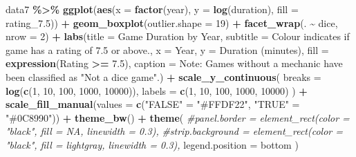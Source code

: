 \documentclass[
]{article}
\newenvironment{Shaded}{\begin{snugshade}}{\end{snugshade}}
\newcommand{\AttributeTok}[1]{\textcolor[rgb]{0.13,0.29,0.53}{#1}}
\newcommand{\CommentTok}[1]{\textcolor[rgb]{0.56,0.35,0.01}{\textit{#1}}}
\newcommand{\DecValTok}[1]{\textcolor[rgb]{0.00,0.00,0.81}{#1}}
\newcommand{\FloatTok}[1]{\textcolor[rgb]{0.00,0.00,0.81}{#1}}
\newcommand{\FunctionTok}[1]{\textcolor[rgb]{0.13,0.29,0.53}{\textbf{#1}}}
\newcommand{\NormalTok}[1]{#1}
\newcommand{\OtherTok}[1]{\textcolor[rgb]{0.56,0.35,0.01}{#1}}
\newcommand{\SpecialCharTok}[1]{\textcolor[rgb]{0.81,0.36,0.00}{\textbf{#1}}}
\newcommand{\StringTok}[1]{\textcolor[rgb]{0.31,0.60,0.02}{#1}}
\begin{document}
\begin{Shaded}
\begin{Highlighting}[]
\NormalTok{data7 }\SpecialCharTok{\%\textgreater{}\%}
  \FunctionTok{ggplot}\NormalTok{(}\FunctionTok{aes}\NormalTok{(}\AttributeTok{x =} \FunctionTok{factor}\NormalTok{(year), }\AttributeTok{y =} \FunctionTok{log}\NormalTok{(duration), }\AttributeTok{fill =}\NormalTok{ rating\_7}\FloatTok{.5}\NormalTok{)) }\SpecialCharTok{+}
  \FunctionTok{geom\_boxplot}\NormalTok{(}\AttributeTok{outlier.shape =} \DecValTok{19}\NormalTok{) }\SpecialCharTok{+}
  \FunctionTok{facet\_wrap}\NormalTok{(. }\SpecialCharTok{\textasciitilde{}}\NormalTok{ dice, }\AttributeTok{nrow =} \DecValTok{2}\NormalTok{) }\SpecialCharTok{+}
  \FunctionTok{labs}\NormalTok{(}\AttributeTok{title =} \StringTok{\textquotesingle{}Game Duration by Year\textquotesingle{}}\NormalTok{,}
       \AttributeTok{subtitle =} \StringTok{\textquotesingle{}Colour indicates if game has a rating of 7.5 or above.\textquotesingle{}}\NormalTok{,}
       \AttributeTok{x =} \StringTok{\textquotesingle{}Year\textquotesingle{}}\NormalTok{, }
       \AttributeTok{y =} \StringTok{\textquotesingle{}Duration (minutes)\textquotesingle{}}\NormalTok{, }
       \AttributeTok{fill =} \FunctionTok{expression}\NormalTok{(}\StringTok{\textquotesingle{}Rating\textquotesingle{}} \SpecialCharTok{\textgreater{}=} \FloatTok{7.5}\NormalTok{),}
       \AttributeTok{caption =} \StringTok{\textquotesingle{}Note: Games without a mechanic have been classified as "Not a dice game".\textquotesingle{}}\NormalTok{) }\SpecialCharTok{+}
  \FunctionTok{scale\_y\_continuous}\NormalTok{(}
    \AttributeTok{breaks =} \FunctionTok{log}\NormalTok{(}\FunctionTok{c}\NormalTok{(}\DecValTok{1}\NormalTok{, }\DecValTok{10}\NormalTok{, }\DecValTok{100}\NormalTok{, }\DecValTok{1000}\NormalTok{, }\DecValTok{10000}\NormalTok{)),}
    \AttributeTok{labels =} \FunctionTok{c}\NormalTok{(}\DecValTok{1}\NormalTok{, }\DecValTok{10}\NormalTok{, }\DecValTok{100}\NormalTok{, }\DecValTok{1000}\NormalTok{, }\DecValTok{10000}\NormalTok{)}
\NormalTok{  ) }\SpecialCharTok{+}
  \FunctionTok{scale\_fill\_manual}\NormalTok{(}\AttributeTok{values =} \FunctionTok{c}\NormalTok{(}\StringTok{"FALSE"} \OtherTok{=} \StringTok{"\#FFDF22"}\NormalTok{, }\StringTok{"TRUE"} \OtherTok{=} \StringTok{"\#0C8990"}\NormalTok{)) }\SpecialCharTok{+}
  \FunctionTok{theme\_bw}\NormalTok{() }\SpecialCharTok{+}
  \FunctionTok{theme}\NormalTok{(}
    \CommentTok{\#panel.border = element\_rect(color = "black", fill = NA, linewidth = 0.3),}
    \CommentTok{\#strip.background = element\_rect(color = "black", fill = \textquotesingle{}lightgray\textquotesingle{}, linewidth = 0.3),}
    \AttributeTok{legend.position =} \StringTok{\textquotesingle{}bottom\textquotesingle{}}
\NormalTok{  )}
\end{Highlighting}
\end{Shaded}
\end{document}

